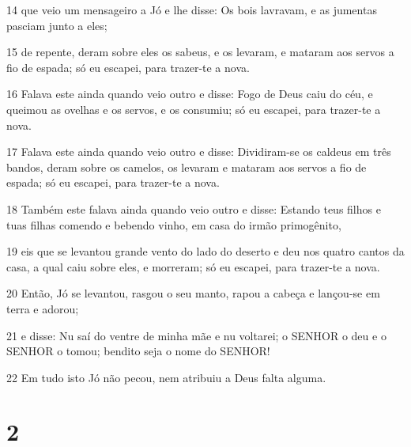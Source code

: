 \par 14 que veio um mensageiro a Jó e lhe disse: Os bois lavravam, e as jumentas pasciam junto a eles;
\par 15 de repente, deram sobre eles os sabeus, e os levaram, e mataram aos servos a fio de espada; só eu escapei, para trazer-te a nova.
\par 16 Falava este ainda quando veio outro e disse: Fogo de Deus caiu do céu, e queimou as ovelhas e os servos, e os consumiu; só eu escapei, para trazer-te a nova.
\par 17 Falava este ainda quando veio outro e disse: Dividiram-se os caldeus em três bandos, deram sobre os camelos, os levaram e mataram aos servos a fio de espada; só eu escapei, para trazer-te a nova.
\par 18 Também este falava ainda quando veio outro e disse: Estando teus filhos e tuas filhas comendo e bebendo vinho, em casa do irmão primogênito,
\par 19 eis que se levantou grande vento do lado do deserto e deu nos quatro cantos da casa, a qual caiu sobre eles, e morreram; só eu escapei, para trazer-te a nova.
\par 20 Então, Jó se levantou, rasgou o seu manto, rapou a cabeça e lançou-se em terra e adorou;
\par 21 e disse: Nu saí do ventre de minha mãe e nu voltarei; o SENHOR o deu e o SENHOR o tomou; bendito seja o nome do SENHOR!
\par 22 Em tudo isto Jó não pecou, nem atribuiu a Deus falta alguma.

\chapter{2}

